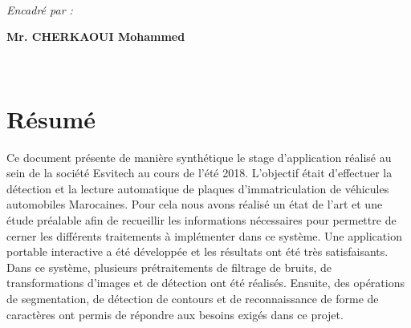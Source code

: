 \documentclass[11pt]{report}
\begin{document}
\begin{center}
\begin{minipage}{1\textwidth}
\begin{center}
		\end{center}																		
	\end{minipage}\\[3cm]
	
	
	\begin{minipage}{1\textwidth}												
		\begin{center}	 \large															
			
		\end{center}															
	\end{minipage}\\[0.5cm]
		\begin{minipage}{1\textwidth}												
					
	\end{minipage}\\[2cm]
	
	
	\begin{minipage}{1\textwidth}
	\begin{center} \large
		\emph{Encadré par :}\\[0.3cm]

		\centering	\item  \textbf{Mr. CHERKAOUI Mohammed} 
					
	\end{center}
	\end{minipage}\\[2.5cm]
	
\end{center}

\setcounter{page}{0}
\thispagestyle{empty}

\newpage
\newpage
{}



\chapter*{Résumé}

Ce document présente de manière synthétique le stage
d'application réalisé au sein de la société Esvitech au cours de
l'été 2018. L'objectif était d’effectuer la détection et la lecture
automatique de plaques d’immatriculation de véhicules
automobiles Marocaines. Pour cela nous avons réalisé un état de
l’art et une étude préalable afin de recueillir les informations
nécessaires pour permettre de cerner les différents traitements à
implémenter dans ce système. Une application portable
interactive a été développée et les résultats ont été très
satisfaisants.
Dans ce système, plusieurs prétraitements de filtrage de bruits,
de transformations d’images et de détection ont été réalisés.
Ensuite, des opérations de segmentation, de détection de
contours et de reconnaissance de forme de caractères ont permis
de répondre aux besoins exigés dans ce projet.
\end{document}
